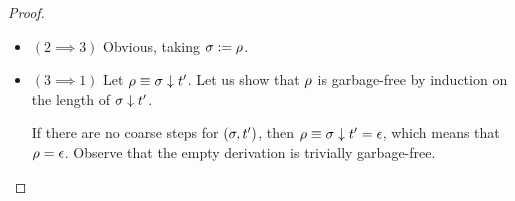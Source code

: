 \begin{proof}
\begin{itemize}
  If there exists a coarse step for $(\redseq,\tm')$, let $\redex_0$ be the leftmost such step.
  Note that $\redseq \permeq \redex_0(\redseq/\redex_0)$ since $\redex_0 \permle \redseq$.
  Moreover, we claim that $\redseq/\redex_0$ is $(\tm'/\redex_0)$-garbage-free.
  Let $\redseqtwo \permle \redseq/\redex_0$ such that $(\redseq/\redex_0)/\redseqtwo$ is garbage
  with respect to the term $(\tm'/\redex_0)/\redseqtwo = \tm'/\redex_0\redseqtwo$,
  and let us show that $(\redseq/\redex_0)/\redseqtwo$ is empty.
  Note that:
  \[
    \begin{array}{rcll}
    \redex_0\redseqtwo
    & \permle & \redex_0(\redseq/\redex_0) & \text{since $\redseqtwo \permle \redseq/\redex_0$} \\
    & \permeq & \redseq                    & \text{as already noted} \\
    \end{array}
  \]
  Moreover, we know that the derivation $\redseq/\redex_0\redseqtwo = (\redseq/\redex_0)/\redseqtwo$ is
  $(\tm'/\redex_0\redseqtwo)$-garbage.
  So, given that $\redseq$ is $\tm'$-garbage-free, we conclude that
  $\redseq/\redex_0\redseqtwo = \emptyDerivation$, that is $(\redseq/\redex_0)/\redseqtwo = \emptyDerivation$,
  which completes the proof of the claim that $\redseq/\redex_0$ is $(\tm'/\redex_0)$-garbage-free.
  We conclude as follows:
  \[
    \begin{array}{rcll}
      \redseq & \permeq & \redex_0(\redseq/\redex_0)                          & \text{as already noted} \\
              & \permeq & \redex_0((\redseq/\redex_0) \sieve (\tm'/\redex_0)) & \text{by \ih since $\redseq/\redex_0$ is $(\tm'/\redex_0)$-garbage-free} \\
              & \permeq & \redseq \sieve \tm'                                 & \text{by definition of sieving} \\
    \end{array}
  \]
\item $(2 \implies 3)$ Obvious, taking $\sigma := \rho$.
\item $(3 \implies 1)$
  Let $\rho \equiv \sigma \downarrow t'$.
  Let us show that $\redseq$ is garbage-free by induction on the length of $\sigma \downarrow t'$.

  If there are no coarse steps for $(\sigma,t')$,
  then $\rho \equiv \sigma \downarrow t' = \epsilon$, which means that $\rho = \epsilon$.
  Observe that the empty derivation is trivially garbage-free.


\end{itemize}
\end{proof}
